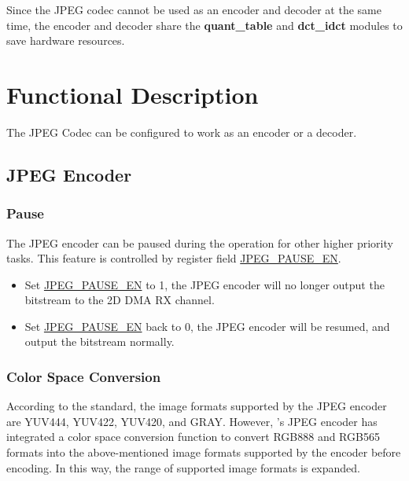 \documentclass[main\_\_EN.tex]{subfiles}
\begin{document}
Since the JPEG codec cannot be used as an encoder and decoder at the same time, the encoder and decoder share the \textbf{quant\_table} and \textbf{dct\_idct} modules to save hardware resources.



\section{Functional Description}
\label{sec:jpegcodec-func-descr}

The JPEG Codec can be configured to work as an encoder or a decoder.

\subsection{JPEG Encoder}
\label{sec:jpegcodec-enc-mode}

\subsubsection{Pause}
\label{sec:jpegcodec-enc-pause}

The JPEG encoder can be paused during the operation for other higher priority tasks. This feature is controlled by register field \hyperref[fielddesc:JPEGPAUSEEN]{JPEG\_PAUSE\_EN}.

\begin{itemize}
    \item Set \hyperref[fielddesc:JPEGPAUSEEN]{JPEG\_PAUSE\_EN} to 1, the JPEG encoder will no longer output the bitstream to the 2D DMA RX channel.
    \item Set \hyperref[fielddesc:JPEGPAUSEEN]{JPEG\_PAUSE\_EN} back to 0, the JPEG encoder will be resumed, and output the bitstream normally.
\end{itemize}

\subsubsection{Color Space Conversion}
\label{sec:jpegcodec-enc-csc}

According to the standard, the image formats supported by the JPEG encoder are YUV444, YUV422, YUV420, and GRAY. However, \chipname{}'s JPEG encoder has integrated a color space conversion function to convert RGB888 and RGB565 formats into the above-mentioned image formats supported by the encoder before encoding. In this way, the range of supported image formats is expanded.
\end{document}

